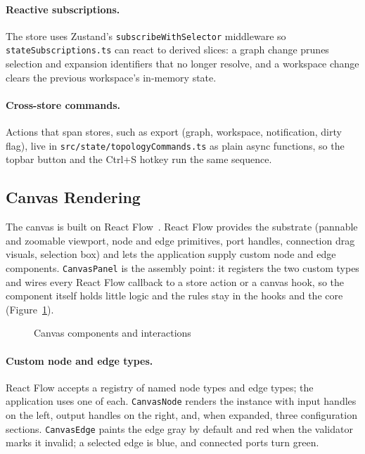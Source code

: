 \paragraph{Reactive subscriptions.}
The store uses Zustand's \texttt{subscribeWithSelector} middleware so \texttt{stateSubscriptions.ts} can react to derived slices: a graph change prunes selection and expansion identifiers that no longer resolve, and a workspace change clears the previous workspace's in-memory state.

\paragraph{Cross-store commands.}
Actions that span stores, such as export (graph, workspace, notification, dirty flag), live in \texttt{src/state/topologyCommands.ts} as plain async functions, so the topbar button and the Ctrl+S hotkey run the same sequence.

\FloatBarrier

\subsection{Canvas Rendering}
\label{sec:canvas-impl}
The canvas is built on React Flow~\cite{react_flow}. React Flow provides the substrate (pannable and zoomable viewport, node and edge primitives, port handles, connection drag visuals, selection box) and lets the application supply custom node and edge components. \texttt{CanvasPanel} is the assembly point: it registers the two custom types and wires every React Flow callback to a store action or a canvas hook, so the component itself holds little logic and the rules stay in the hooks and the core (Figure~\ref{fig:canvas-impl}).

\begin{figure}[H]
    \centering
    \resizebox{0.9\textwidth}{!}{
        
    }
    \caption[Canvas components, hooks, core, and store.]{Canvas components and interactions}
    \label{fig:canvas-impl}
\end{figure}

\paragraph{Custom node and edge types.}
React Flow accepts a registry of named node types and edge types; the application uses one of each. \texttt{CanvasNode} renders the instance with input handles on the left, output handles on the right, and, when expanded, three configuration sections. \texttt{CanvasEdge} paints the edge gray by default and red when the validator marks it invalid; a selected edge is blue, and connected ports turn green.

